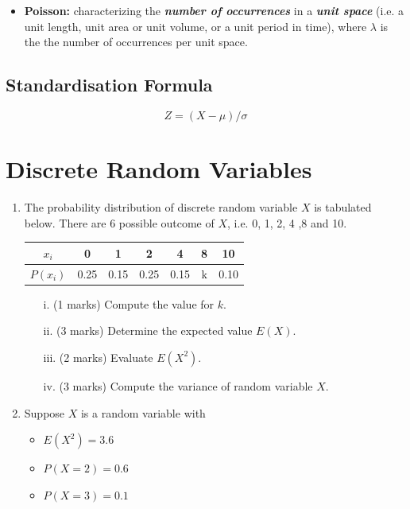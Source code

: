 \documentclass[12pt]{report}
\begin{document}
{{{\begin{itemize}
		\item \textbf{Poisson:}  characterizing the \textbf{\emph{number of occurrences}} in a \textbf{\emph{unit space}} (i.e. a unit length, unit area or unit volume, or a unit period in time), where $\lambda$ is the the number of occurrences per unit space.
		
	\end{itemize}
}


\subsection{Standardisation Formula}

\begin{equation}
Z = ( X - \mu ) / \sigma
\end{equation}



\section{Discrete Random Variables}
\begin{enumerate}
	\item  The probability distribution of discrete random variable $X$ is tabulated below. There are 6 possible outcome of $X$, i.e. 0, 1, 2, 4 ,8 and 10.
	\begin{center}
		\begin{tabular}{|c||c|c|c|c|c|c|}
			\hline
			$x_i$  & 0 & 1 & 2 & 4 & 8 & 10 \\\hline
			$P(x_i)$ & 0.25 & 0.15 & 0.25 & 0.15 & k & 0.10\\
			\hline
		\end{tabular}
	\end{center}
	
	\begin{itemize}
		\item[i.] (1 marks) Compute the value for $k$.
		\item[ii.] (3 marks) Determine the expected value $E(X)$.
		\item[iii.] (2 marks) Evaluate $E(X^2)$.
		\item[iv.] (3 marks) Compute the variance of random variable $X$.
	\end{itemize}
	\item 
	Suppose $X$ is a random variable with 
	\begin{itemize}
		\item $E(X^2)=3.6$
		\item $P(X=2)=0.6$
		\item $P(X=3)=0.1$
	\end{itemize}
	

\end{enumerate}}}
\end{document}
